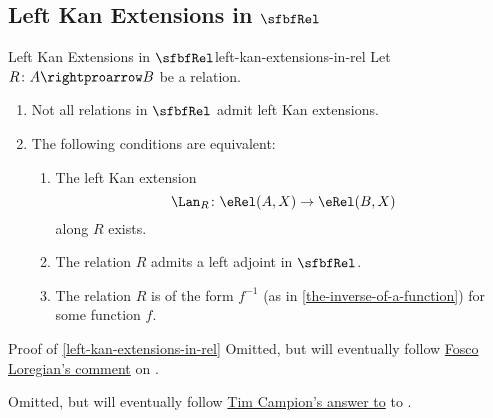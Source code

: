 \subsection{Left Kan Extensions in $\sfbfRel$}\label{subsection-left-kan-extensions-in-rel}
\begin{proposition}{Left Kan Extensions in $\sfbfRel$}{left-kan-extensions-in-rel}%
    Let $R\colon A\rightproarrow B$ be a relation.
    \begin{enumerate}
        \item\label{left-kan-extensions-in-rel-non-existence-of-all-left-kan-extensions-in-rel}Not all relations in $\sfbfRel$ admit left Kan extensions.
        \item\label{left-kan-extensions-in-rel-characterisation-of-relations-admitting-left-kan-extensions-along-them}The following conditions are equivalent:
            \begin{enumerate}
                \item The left Kan extension
                    \[
                        \Lan_{R}%
                        \colon%
                        \eRel(A,X)%
                        \to%
                        \eRel(B,X)%
                    \]%
                    along $R$ exists.
                \item The relation $R$ admits a left adjoint in $\sfbfRel$.
                \item The relation $R$ is of the form $f^{-1}$ (as in \cref{the-inverse-of-a-function}) for some function $f$.
            \end{enumerate}
    \end{enumerate}
\end{proposition}
\begin{Proof}{Proof of \cref{left-kan-extensions-in-rel}}%
    Omitted, but will eventually follow \href{https://mathoverflow.net/questions/460656/existence-and-characterisations-of-left-kan-extensions-and-liftings-in-the-bicat\#comment1194691\_460656}{Fosco Loregian's comment} on \cite{MO460656}.

    Omitted, but will eventually follow \href{https://mathoverflow.net/a/460693}{Tim Campion's answer to} to \cite{MO460656}.
\end{Proof}

